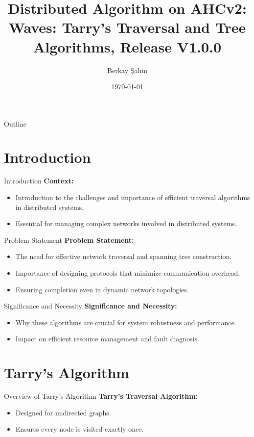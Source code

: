 \documentclass[11pt]{beamer}
\title[Distributed Algorithm on AHCv2]{Distributed Algorithm on AHCv2: Waves: Tarry's Traversal and Tree Algorithms, Release V1.0.0}
\author[Berkay Şahin]{Berkay Şahin}
\date{\today}
\begin{document}
\begin{frame}[plain]
    \titlepage
\end{frame}

\begin{frame}{Outline}
    \tableofcontents
\end{frame}

\section{Introduction}
\begin{frame}{Introduction}
    \textbf{Context:}
    \begin{itemize}
        \item Introduction to the challenges and importance of efficient traversal algorithms in distributed systems.
        \item Essential for managing complex networks involved in distributed systems.
    \end{itemize}
\end{frame}

\begin{frame}{Problem Statement}
    \textbf{Problem Statement:}
    \begin{itemize}
        \item The need for effective network traversal and spanning tree construction.
        \item Importance of designing protocols that minimize communication overhead.
        \item Ensuring completion even in dynamic network topologies.
    \end{itemize}
\end{frame}

\begin{frame}{Significance and Necessity}
    \textbf{Significance and Necessity:}
    \begin{itemize}
        \item Why these algorithms are crucial for system robustness and performance.
        \item Impact on efficient resource management and fault diagnosis.
    \end{itemize}
\end{frame}

\section{Tarry's Algorithm}
\begin{frame}{Overview of Tarry's Algorithm}
    \textbf{Tarry's Traversal Algorithm:}
    \begin{itemize}
        \item Designed for undirected graphs.
        \item Ensures every node is visited exactly once.
    \end{itemize}
\end{frame}
\end{document}
